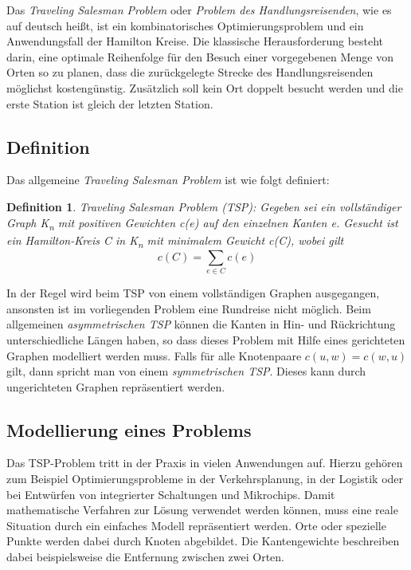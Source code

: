 \documentclass{article}
\newtheorem{mydef}{Definition}
\begin{document}
Das \textit{Traveling Salesman Problem} oder \textit{Problem des Handlungsreisenden}, wie es auf deutsch heißt, ist ein kombinatorisches Optimierungsproblem und ein Anwendungsfall der Hamilton Kreise. Die klassische Herausforderung besteht darin, eine optimale Reihenfolge für den Besuch einer vorgegebenen Menge von Orten so zu planen, dass die zurückgelegte Strecke des Handlungsreisenden möglichst kostengünstig. Zusätzlich soll kein Ort doppelt besucht werden und die erste Station ist gleich der letzten Station. 


\subsection{Definition}
Das allgemeine \textit{Traveling Salesman Problem} ist wie folgt definiert:
\begin{mydef}
	Traveling Salesman Problem (TSP): Gegeben sei ein vollständiger Graph K\textsubscript{n} mit positiven Gewichten \textit{c(e)} auf den einzelnen Kanten  \textit{e}. Gesucht ist ein Hamilton-Kreis \textit{C} in K\textsubscript{n} mit minimalem Gewicht c(C), wobei gilt
	\[c(C) =  \sum_{e \in C}  c(e) \]
\end{mydef}

In der Regel wird beim TSP von einem vollständigen Graphen ausgegangen, ansonsten ist im vorliegenden Problem eine Rundreise nicht möglich. Beim allgemeinen \textit{asymmetrischen TSP} können die Kanten in Hin- und Rückrichtung unterschiedliche Längen haben, so dass dieses Problem mit Hilfe eines gerichteten Graphen modelliert werden muss. Falls für alle Knotenpaare $c(u,w) = c(w,u)$ gilt, dann spricht man von einem \textit{symmetrischen TSP}. Dieses kann durch ungerichteten Graphen repräsentiert werden.

\subsection{Modellierung eines Problems}

Das TSP-Problem tritt in der Praxis in vielen Anwendungen auf. Hierzu gehören zum Beispiel Optimierungsprobleme in der Verkehrsplanung, in der Logistik oder bei Entwürfen von integrierter Schaltungen und Mikrochips. Damit mathematische Verfahren zur Lösung verwendet werden können, muss eine reale Situation durch ein einfaches Modell repräsentiert werden. Orte oder spezielle Punkte werden dabei durch Knoten abgebildet. Die Kantengewichte beschreiben dabei beispielsweise die Entfernung zwischen zwei Orten.
\end{document}

